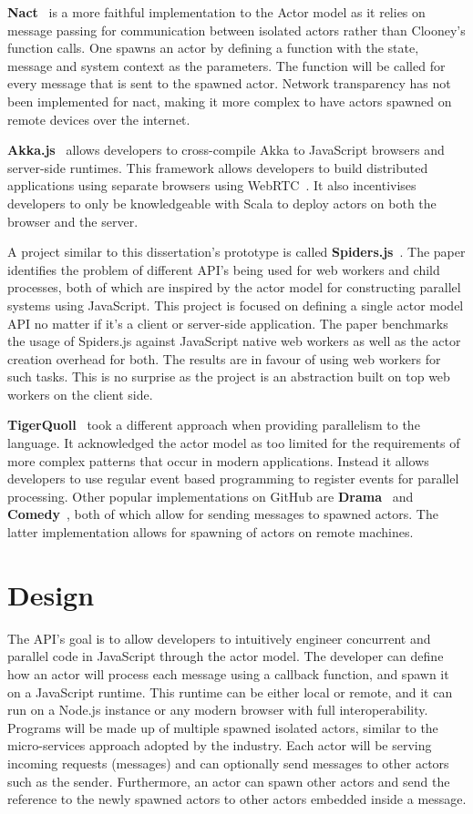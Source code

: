 \documentclass[12pt, a4paper]{report}
\theoremstyle{definition}
\theoremstyle{definition}%
\theoremstyle{definition}%
\theoremstyle{definition}%
\theoremstyle{definition}%
\theoremstyle{definition}%
\begin{document}
\textbf{Nact}~\cite{nact} is a more faithful implementation to the Actor model as it relies on message passing for communication between isolated actors rather than Clooney's function calls. One spawns an actor by defining a function with the state, message and system context as the parameters. The function will be called for every message that is sent to the spawned actor. Network transparency has not been implemented for nact, making it more complex to have actors spawned on remote devices over the internet.

\textbf{Akka.js}~\cite{stivan2015akka} allows developers to cross-compile Akka to JavaScript browsers and server-side runtimes. This framework allows developers to build distributed applications using separate browsers using WebRTC~. It also incentivises developers to only be knowledgeable with Scala to deploy actors on both the browser and the server.

A project similar to this dissertation's prototype is called \textbf{Spiders.js}~\cite{spidersjs}. The paper identifies the problem of different API's being used for web workers and child processes, both of which are inspired by the actor model for constructing parallel systems using JavaScript. This project is focused on defining a single actor model API no matter if it's a client or server-side application. The paper benchmarks the usage of Spiders.js against JavaScript native web workers as well as the actor creation overhead for both. The results are in favour of using web workers for such tasks. This is no surprise as the project is an abstraction built on top web workers on the client side.

\textbf{TigerQuoll}~\cite{tigerquoll} took a different approach when providing parallelism to the language. It acknowledged the actor model as too limited for the requirements of more complex patterns that occur in modern applications. Instead it allows developers to use regular event based programming to register events for parallel processing. Other popular implementations on GitHub are \textbf{Drama}~\cite{drama} and \textbf{Comedy}~\cite{comedy}, both of which allow for sending messages to spawned actors. The latter implementation allows for spawning of actors on remote machines.

\chapter{Design}
The API’s goal is to allow developers to intuitively engineer concurrent and parallel code in JavaScript through the actor model. The developer can define how an actor will process each message using a callback function, and spawn it on a JavaScript runtime. This runtime can be either local or remote, and it can run on a Node.js instance or any modern browser with full interoperability. Programs will be made up of multiple spawned isolated actors, similar to the micro-services approach adopted by the industry. Each actor will be serving incoming requests (messages) and can optionally send messages to other actors such as the sender. Furthermore, an actor can spawn other actors and send the reference to the newly spawned actors to other actors embedded inside a message.
\end{document}
